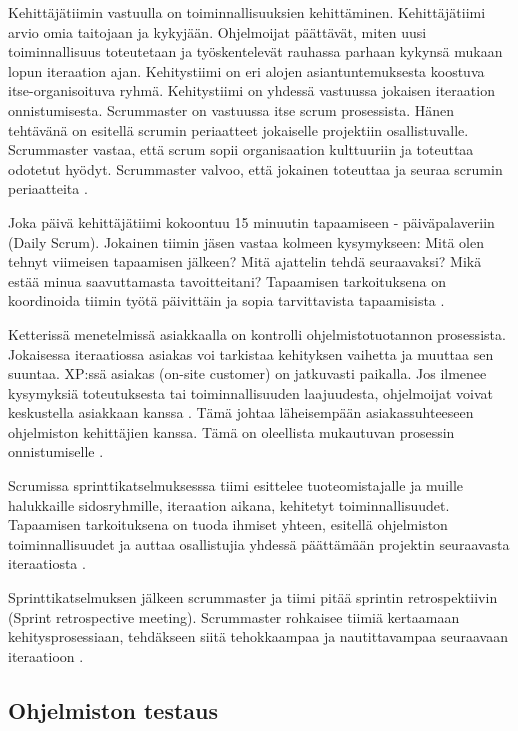 \documentclass[finnish]{tktltiki2}
\theoremstyle{definition}
\theoremstyle{remark}
\begin{document}
Kehittäjätiimin vastuulla on toiminnallisuuksien kehittäminen. Kehittäjätiimi arvio omia taitojaan ja kykyjään. Ohjelmoijat päättävät, miten uusi toiminnallisuus toteutetaan ja työskentelevät rauhassa parhaan kykynsä mukaan lopun iteraation ajan. Kehitystiimi on eri alojen asiantuntemuksesta koostuva itse-organisoituva ryhmä. Kehitystiimi on yhdessä vastuussa jokaisen iteraation onnistumisesta. Scrummaster on vastuussa itse scrum prosessista. Hänen tehtävänä on esitellä scrumin periaatteet jokaiselle projektiin osallistuvalle. Scrummaster vastaa, että scrum sopii organisaation kulttuuriin ja toteuttaa odotetut hyödyt. Scrummaster valvoo, että jokainen toteuttaa ja seuraa scrumin periaatteita \cite{SCH09}.

Joka päivä kehittäjätiimi kokoontuu 15 minuutin tapaamiseen - päiväpalaveriin (Daily Scrum). Jokainen tiimin jäsen vastaa kolmeen kysymykseen: Mitä olen tehnyt viimeisen tapaamisen jälkeen? Mitä ajattelin tehdä seuraavaksi? Mikä estää minua saavuttamasta tavoitteitani? Tapaamisen tarkoituksena on koordinoida tiimin työtä päivittäin ja sopia tarvittavista tapaamisista \cite{SCH09}.

Ketterissä menetelmissä asiakkaalla on kontrolli ohjelmistotuotannon prosessista. Jokaisessa iteraatiossa asiakas voi tarkistaa kehityksen vaihetta ja muuttaa sen suuntaa. XP:ssä asiakas (on-site customer) on jatkuvasti paikalla. Jos ilmenee kysymyksiä toteutuksesta tai toiminnallisuuden laajuudesta, ohjelmoijat voivat keskustella asiakkaan kanssa \cite{BEC99}. Tämä johtaa läheisempään asiakassuhteeseen ohjelmiston kehittäjien kanssa. Tämä on oleellista mukautuvan prosessin onnistumiselle \cite{FOW01a}.

Scrumissa sprinttikatselmuksesssa tiimi esittelee tuoteomistajalle ja muille halukkaille sidosryhmille, iteraation aikana, kehitetyt toiminnallisuudet. Tapaamisen tarkoituksena on tuoda ihmiset yhteen, esitellä ohjelmiston toiminnallisuudet ja auttaa osallistujia yhdessä päättämään projektin seuraavasta iteraatiosta \cite{SCH09}. 

Sprinttikatselmuksen jälkeen scrummaster ja tiimi pitää sprintin retrospektiivin (Sprint retrospective meeting). Scrummaster rohkaisee tiimiä kertaamaan kehitysprosessiaan, tehdäkseen siitä tehokkaampaa ja nautittavampaa seuraavaan iteraatioon \cite{SCH09}.

\subsection{Ohjelmiston testaus}
\end{document}
